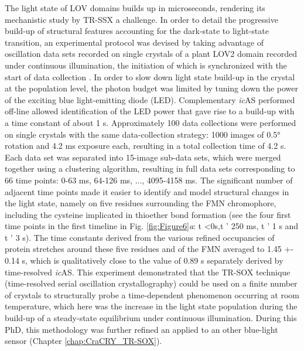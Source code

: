 The light state of LOV domains builds up in microseconds, rendering its mechanistic study by TR-SSX a challenge. In order to detail the progressive build-up of structural features accounting for the dark-state to light-state transition, an experimental protocol was devised by taking advantage of oscillation data sets recorded on single crystals of a plant LOV2 domain recorded under continuous illumination, the initiation of which is synchronized with the start of data collection \parencite{aumonierMillisecondTimeresolvedSerial2020}. In order to slow down light state build-up in the crystal at the population level, the photon budget was limited by tuning down the power of the exciting blue light-emitting diode (LED). Complementary \textit{ic}AS performed off-line allowed identification of the LED power that gave rise to a build-up with a time constant of about 1 s. Approximately 100 data collections were performed on single crystals with the same data-collection strategy: 1000 images of 0.5° rotation and 4.2 ms exposure each, resulting in a total collection time of 4.2 s. Each data set was separated into 15-image sub-data sets, which were merged together using a clustering algorithm, resulting in full data sets corresponding to 66 time points: 0-63 ms, 64-126 ms, ..., 4095-4158 ms. The significant number of adjacent time points made it easier to identify and model structural changes in the light state, namely on five residues surrounding the FMN chromophore, including the cysteine implicated in thioether bond formation (see the four first time points in the first timeline in Fig. \ref{fig:Figure6}\textit{a}: t <0s,t ’ 250 ms, t ’ 1 s and t ’ 3 s). The time constants derived from the various refined occupancies of protein stretches around these five residues and of the FMN averaged to 1.45 +- 0.14 s, which is qualitatively close to the value of 0.89 s separately derived by time-resolved \textit{ic}AS. This experiment demonstrated that the TR-SOX technique (time-resolved serial oscillation crystallography) could be used on a finite number of crystals to structurally probe a time-dependent phenomenon occurring at room temperature, which here was the increase in the light state population during the build-up of a steady-state equilibrium under continuous illumination. During this PhD, this methodology was further refined an applied to an other blue-light sensor (Chapter \ref{chap:CraCRY_TR-SOX}).

